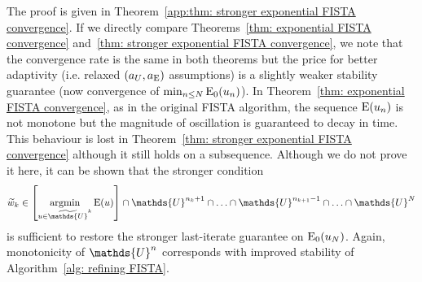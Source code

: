 \documentclass[smallextended]{svjour3}
\let\F\mathds\let\C\mathcal\newcommand{\R}{\F{R}}\newcommand{\A}{\tens{A}}
\newcommand{\op}[1]{\operatorname{#1}}
\newcommand{\1}{\F{1}}
\DeclareMathOperator*{\argmin}{argmin}
\newcommand*{\varf}[1]{%
	\IfEqCase{#1}{%
		{0}{u}%
		{1}{v}%
		{2}{w}%
	}[u#1]%
}
\newcommand*{\Varf}[1]{%
	\IfEqCase{#1}{%
		{0}{U}%
		{1}{V}%
		{2}{W}%
	}[u#1]%
}
\newcommand*{\spcf}[1]{%
	\IfEqCase{#1}{%
		{0}{\F{U}}%
		{1}{\F{V}}%
		{2}{\F{W}}%
	}[\F{U}#1]%
}
\newcommand*{\vars}[1]{%
	\IfEqCase{#1}{%
		{0}{\alpha}%
		{1}{\beta}%
		{2}{\gamma}%
		{3}{a}%
		{4}{b}%
		{5}{c}%
	}[k#1]%
}
\begin{document}
	\noindent The proof is given in Theorem~\ref{app:thm: stronger exponential FISTA convergence}. If we directly compare Theorems~\ref{thm: exponential FISTA convergence} and~\ref{thm: stronger exponential FISTA convergence}, we note that the convergence rate is the same in both theorems but the price for better adaptivity (i.e. relaxed $(\vars3_{\Varf0},\vars3_{\op{E}})$ assumptions) is a slightly weaker stability guarantee (now convergence of $\min_{n\leq N}\op{E}_0(\varf0_n)$). In Theorem~\ref{thm: exponential FISTA convergence}, as in the original FISTA algorithm, the sequence $\op{E}(\varf0_n)$ is not monotone but the magnitude of oscillation is guaranteed to decay in time. This behaviour is lost in Theorem~\ref{thm: stronger exponential FISTA convergence} although it still holds on a subsequence. Although we do not prove it here, it can be shown that the stronger condition 
	\begin{equation}
		\tilde{\varf2}_k \in \left[\argmin_{\varf0\in\tilde{\spcf0}^k}\op{E}(\varf0)\right]\cap\spcf0^{n_k+1} \cap\ldots\cap \spcf0^{n_{k+1}-1}\cap\ldots\cap \spcf0^N
	\end{equation}
	is sufficient to restore the stronger last-iterate guarantee on $\op{E}_0(\varf0_N)$. Again, monotonicity of $\spcf0^n$ corresponds with improved stability of Algorithm~\ref{alg: refining FISTA}.
	
\end{document}
